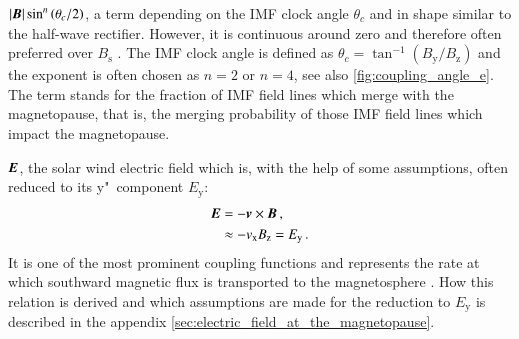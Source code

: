 \begin{itemize*}
	\item $|\boldsymbol{B}| \sin^n\left(\theta_c / 2\right)$, a term depending on the IMF clock angle $\theta_c$ and in shape similar to the half-wave rectifier. However, it is continuous around zero and therefore often preferred over $B_\text{s}$ \citep{Lockwood2013}. The IMF clock angle is defined as $\theta_c = \tan^{-1}\left(B_\text{y} / B_\text{z}\right)$ and the exponent is often chosen as $n = 2$ or $n = 4$, see also \autoref{fig:coupling_angle_e}. The term stands for the fraction of IMF field lines which merge with the magnetopause, that is, the merging probability of those IMF field lines which impact the magnetopause.
	\begin{figure}[htb]
	\end{figure}
	
	\item $\boldsymbol{E}$, the solar wind electric field which is, with the help of some assumptions, often reduced to its y"~component $E_\text{y}$:
	\begin{align}
		\boldsymbol{E} &= -\boldsymbol{v} \times \boldsymbol{B}	\,,\\
			&\approx -v_\text{x} B_\text{z} =  E_\text{y}	\,.	\label{eq:coupling_vxBz}
	\end{align}
	It is one of the most prominent coupling functions and represents the rate at which southward magnetic flux is transported to the magnetosphere \citep[p.~103]{Russell2007}. How this relation is derived and which assumptions are made for the reduction to $E_\text{y}$ is described in the appendix \autoref{sec:electric_field_at_the_magnetopause}.
	

\end{itemize*}
